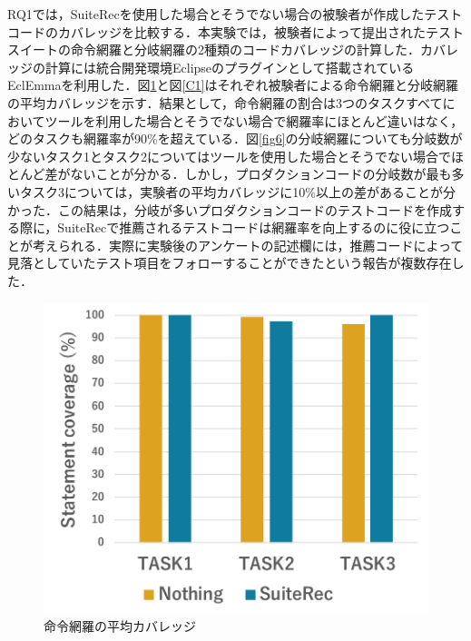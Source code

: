 \documentclass[12pt]{jarticle} %
\begin{document}
RQ1では，{\sf SuiteRec}を使用した場合とそうでない場合の被験者が作成したテストコードのカバレッジを比較する．本実験では，被験者によって提出されたテストスイートの命令網羅と分岐網羅の2種類のコードカバレッジの計算した．カバレッジの計算には統合開発環境Eclipse\cite{b21}のプラグインとして搭載されているEclEmma\cite{b11}を利用した．図\ref{C0}と図\ref{C1}はそれぞれ被験者による命令網羅と分岐網羅の平均カバレッジを示す．結果として，命令網羅の割合は3つのタスクすべてにおいてツールを利用した場合とそうでない場合で網羅率にほとんど違いはなく，どのタスクも網羅率が90\%を超えている．図\ref{fig6}の分岐網羅についても分岐数が少ないタスク1とタスク2についてはツールを使用した場合とそうでない場合でほとんど差がないことが分かる．しかし，プロダクションコードの分岐数が最も多いタスク3については，実験者の平均カバレッジに10\%以上の差があることが分かった．この結果は，分岐が多いプロダクションコードのテストコードを作成する際に，{\sf SuiteRec}で推薦されるテストコードは網羅率を向上するのに役に立つことが考えられる．実際に実験後のアンケートの記述欄には，推薦コードによって見落としていたテスト項目をフォローすることができたという報告が複数存在した．

\begin{figure}[htbp]
  \begin{center}
   \includegraphics[width=12cm]{C0.pdf}
  \caption{命令網羅の平均カバレッジ}
  \label{C0}
  \end{center}
\end{figure}
\end{document}
